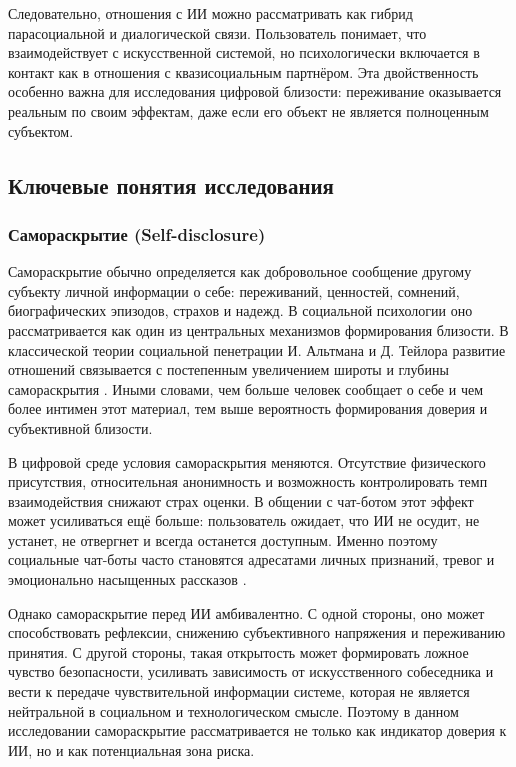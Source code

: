\documentclass[areasetadvanced]{scrartcl}
\begin{document}
Следовательно, отношения с ИИ можно рассматривать как гибрид
парасоциальной и диалогической связи. Пользователь понимает, что
взаимодействует с искусственной системой, но психологически включается
в контакт как в отношения с квазисоциальным партнёром. Эта
двойственность особенно важна для исследования цифровой близости:
переживание оказывается реальным по своим эффектам, даже если его
объект не является полноценным субъектом.

\subsection{Ключевые понятия исследования}

\subsubsection{Самораскрытие (Self-disclosure)}

Самораскрытие обычно определяется как добровольное сообщение другому
субъекту личной информации о себе: переживаний, ценностей, сомнений,
биографических эпизодов, страхов и надежд. В социальной психологии оно
рассматривается как один из центральных механизмов формирования
близости. В классической теории социальной пенетрации И. Альтмана и
Д. Тейлора развитие отношений связывается с постепенным увеличением
широты и глубины самораскрытия \cite{AltmanTaylor1973}. Иными словами,
чем больше человек сообщает о себе и чем более интимен этот материал,
тем выше вероятность формирования доверия и субъективной близости.

В цифровой среде условия самораскрытия меняются. Отсутствие
физического присутствия, относительная анонимность и возможность
контролировать темп взаимодействия снижают страх оценки. В общении с
чат-ботом этот эффект может усиливаться ещё больше: пользователь
ожидает, что ИИ не осудит, не устанет, не отвергнет и всегда останется
доступным. Именно поэтому социальные чат-боты часто становятся
адресатами личных признаний, тревог и эмоционально насыщенных
рассказов \cite{Brandtzaeg2022}.

Однако самораскрытие перед ИИ амбивалентно. С одной стороны, оно может
способствовать рефлексии, снижению субъективного напряжения и
переживанию принятия. С другой стороны, такая открытость может
формировать ложное чувство безопасности, усиливать зависимость от
искусственного собеседника и вести к передаче чувствительной
информации системе, которая не является нейтральной в социальном и
технологическом смысле. Поэтому в данном исследовании самораскрытие
рассматривается не только как индикатор доверия к ИИ, но и как
потенциальная зона риска.
\end{document}
